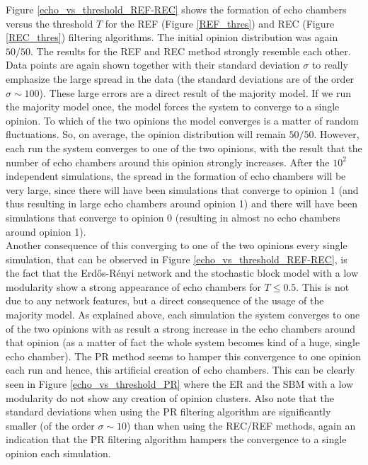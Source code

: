 \documentclass[11 pt , letterpaper , twoside , openright]{book}
\begin{document}
Figure \ref{echo_vs_threshold_REF-REC} shows the formation of echo chambers versus the threshold $T$ for the REF (Figure \ref{REF_thres}) and REC (Figure \ref{REC_thres}) filtering algorithms. The initial opinion distribution was again $50/50$. The results for the REF and REC method strongly resemble each other. Data points are again shown together with their standard deviation $\sigma$ to really emphasize the large spread in the data (the standard deviations are of the order $\sigma \sim 100$). These large errors are a direct result of the majority model. If we run the majority model once, the model forces the system to converge to a single opinion. To which of the two opinions the model converges is a matter of random fluctuations. So, on average, the opinion distribution will remain $50/50$. However, each run the system converges to one of the two opinions, with the result that the number of echo chambers around this opinion strongly increases. After the $10^2$ independent simulations, the spread in the formation of echo chambers will be very large, since there will have been simulations that converge to opinion 1 (and thus resulting in large echo chambers around opinion 1) and there will have been simulations that converge to opinion 0 (resulting in almost no echo chambers around opinion 1).\\
Another consequence of this converging to one of the two opinions every single simulation, that can be observed in Figure \ref{echo_vs_threshold_REF-REC}, is the fact that the Erd\H{o}s-R\'{e}nyi network and the stochastic block model with a low modularity show a strong appearance of echo chambers for $T \leqslant 0.5$. This is not due to any network features, but a direct consequence of the usage of the majority model. As explained above, each simulation the system converges to one of the two opinions with as result a strong increase in the echo chambers around that opinion (as a matter of fact the whole system becomes kind of a huge, single echo chamber). The PR method seems to hamper this convergence to one opinion each run and hence, this artificial creation of echo chambers. This can be clearly seen in Figure \ref{echo_vs_threshold_PR} where the ER and the SBM with a low modularity do not show any creation of opinion clusters. Also note that the standard deviations when using the PR filtering algorithm are significantly smaller (of the order $\sigma \sim 10$) than when using the REC/REF methods, again an indication that the PR filtering algorithm hampers the convergence to a single opinion each simulation.\\
\end{document}
